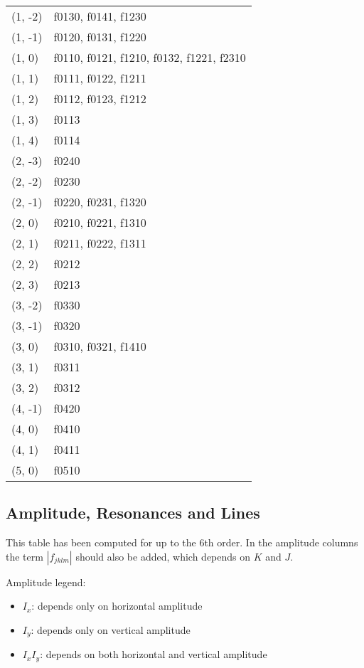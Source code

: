 \documentclass[openright,twoside,headsepline,bibliography=totoc]{scrbook}
\begin{document}
\begin{longtable}[]{@{}ll@{}}
(1, -2) & f0130, f0141, f1230 \\
(1, -1) & f0120, f0131, f1220 \\
(1, 0) & f0110, f0121, f1210, f0132, f1221, f2310 \\
(1, 1) & f0111, f0122, f1211 \\
(1, 2) & f0112, f0123, f1212 \\
(1, 3) & f0113 \\
(1, 4) & f0114 \\
(2, -3) & f0240 \\
(2, -2) & f0230 \\
(2, -1) & f0220, f0231, f1320 \\
(2, 0) & f0210, f0221, f1310 \\
(2, 1) & f0211, f0222, f1311 \\
(2, 2) & f0212 \\
(2, 3) & f0213 \\
(3, -2) & f0330 \\
(3, -1) & f0320 \\
(3, 0) & f0310, f0321, f1410 \\
(3, 1) & f0311 \\
(3, 2) & f0312 \\
(4, -1) & f0420 \\
(4, 0) & f0410 \\
(4, 1) & f0411 \\
(5, 0) & f0510 \\
\bottomrule()
\end{longtable}

\newpage

\hypertarget{amplitude-resonances-and-lines}{%
\subsection{Amplitude, Resonances and
Lines}\label{amplitude-resonances-and-lines}}

This table has been computed for up to the 6th order. In the amplitude
columns the term \(|f_{jklm}|\) should also be added, which depends on
\(K\) and \(J\).

Amplitude legend:

\begin{itemize}
\tightlist
\item
  \colorbox{orange!20}{$I_x$}: depends only on horizontal amplitude
\item
  \colorbox{red!20}{$I_y$}: depends only on vertical amplitude
\item
  \colorbox{blue!20}{$I_x I_y$}: depends on both horizontal and vertical
  amplitude
\end{itemize}
\end{document}
